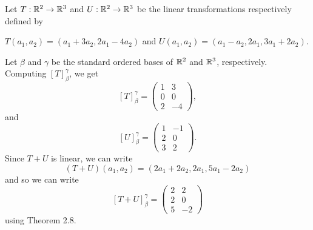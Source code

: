 \begin{eg}
    Let \( T: \mathbb{R}^{2} \to \mathbb{R}^{3}  \) and \( U: \mathbb{R}^{2} \to \mathbb{R}^{3} \) be the linear transformations respectively defined by 
    \begin{center}
        \( T({a}_{1},{a}_{2}) = ({a}_{1} + {3a}_{2}, {2a}_{1} - {4a}_{2}) \) and \( U({a}_{1}, {a}_{2}) = ({a}_{1} - {a}_{2}, {2a}_{1}, {3a}_{1} + {2a}_{2}) \).
    \end{center}
    Let \( \beta \) and \( \gamma \) be the standard ordered bases of \( \mathbb{R}^{2}  \) and \( \mathbb{R}^{3}  \), respectively. Computing \( [T]_{\beta}^{\gamma}  \), we get
    \[ [T]_{\beta}^{\gamma}  = \begin{pmatrix}
        1 & 3 \\
        0 & 0 \\
        2 & -4 
    \end{pmatrix},  \]
    and 
    \[ [U]_{\beta}^{\gamma}  = \begin{pmatrix}
        1 & -1 \\
        2 & 0 \\
        3 & 2
    \end{pmatrix}.  \]
    Since \( T + U  \) is linear, we can write 
    \[  (T+U)({a}_{1}, {a}_{2}) = ({2a}_{1} + {2a}_{2} , {2a}_{1}, {5a}_{1} - {2a}_{2}) \]
    and so we can write
    \[  [T+U]_{\beta}^{\gamma}  = \begin{pmatrix}
        2 & 2 \\
        2 & 0 \\
        5 & -2 
    \end{pmatrix} \]
    using Theorem 2.8.
\end{eg}

